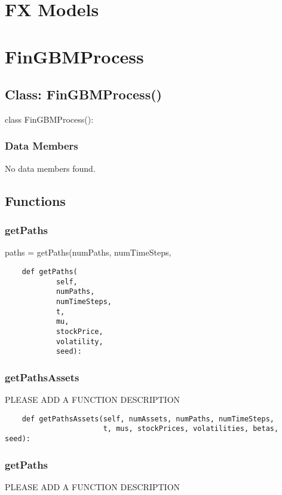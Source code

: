 \documentclass[twoside,11pt]{book}
\begin{document}
\section*{FX Models}
\newpage
\section{FinGBMProcess}

\subsection*{Class: FinGBMProcess()}
class FinGBMProcess(): 

\subsubsection*{Data Members}
No data members found.

\subsection*{Functions}

\subsubsection*{{\bf getPaths}}
paths = getPaths(numPaths, numTimeSteps, 

\begin{lstlisting}
    def getPaths(
            self,
            numPaths,
            numTimeSteps,
            t,
            mu,
            stockPrice,
            volatility,
            seed):
\end{lstlisting}

\subsubsection*{{\bf getPathsAssets}}
PLEASE ADD A FUNCTION DESCRIPTION

\begin{lstlisting}
    def getPathsAssets(self, numAssets, numPaths, numTimeSteps,
                       t, mus, stockPrices, volatilities, betas, seed):
\end{lstlisting}

\subsubsection*{{\bf getPaths}}
PLEASE ADD A FUNCTION DESCRIPTION
\end{document}
